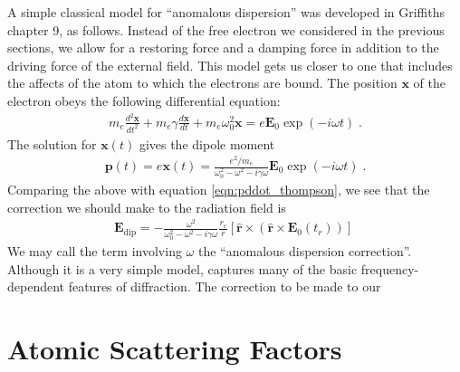 \documentclass[12pt]{article}
\renewcommand{\vec}[1]{\boldsymbol{#1}}
\newcommand{\hvec}[1]{\hat{\vec{#1}}}
\begin{document}
A simple classical model for ``anomalous dispersion'' was developed in 
Griffiths chapter 9, as follows.  Instead of the free electron we considered in 
the previous sections, we allow for a restoring force and a damping force in 
addition to the driving force of the external field.  This model gets us 
closer to one that includes the affects of the atom to which the electrons 
are bound.  The position $\vec{x}$ of the electron obeys the following 
differential equation:
\begin{align}
m_e \frac{d^2\vec{x}}{dt^2} + m_e \gamma \frac{d\vec{x}}{dt} + m_e\omega_0^2 
\vec{x} = e \vec{E}_0 \exp(-i\omega t) \;.
\end{align}
The solution for $\vec{x}(t)$ gives the dipole moment
\begin{align}\label{eqn:dddipole}
\vec{p}(t) = e \vec{x}(t) = \frac{e^2/m_e}{\omega_0^2 - \omega^2 - i \gamma 
\omega}\vec{E}_0 \exp(-i\omega t) \;.
\end{align}
Comparing the above with equation \ref{eqn:pddot_thompson}, we see that the 
correction we should make to the radiation field is
\begin{align}
\vec{E}_{\text{dip}} =  -\frac{\omega^2}{\omega_0^2 - \omega^2 - i \gamma 
\omega}\frac{r_e}{r} [\hvec{r} \times ( \hvec{r} \times  
\vec{E}_0(t_r))] \;
\end{align}
We may call the term involving $\omega$ the ``anomalous dispersion correction''.
Although it is a very simple model, captures many of the basic 
frequency-dependent features of diffraction.  The correction to be made to our 


\section{Atomic Scattering Factors}
\end{document}

